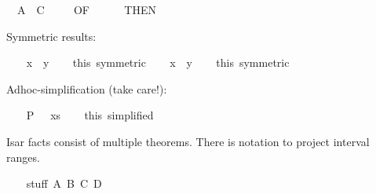 \begin{isabellebody}
\ {}{}\ {}A\ {}\ C{}\isanewline
\ \ \isamarkupfalse%
\ {}\ {}OF\ {}{}\isanewline
\ \ \isamarkupfalse%
\ {}\ {}THEN\ {}{}%
\begin{isamarkuptxt}%
Symmetric results:%
\end{isamarkuptxt}%
\isamarkuptrue%
\ \ \isamarkupfalse%
\ {}x\ {}\ y{}\isanewline
\ \ \isamarkupfalse%
\ this\ {}symmetric{}\isanewline
\isanewline
\ \ \isamarkupfalse%
\ {}x\ {}\ y{}\isanewline
\ \ \isamarkupfalse%
\ this\ {}symmetric{}%
\begin{isamarkuptxt}%
Adhoc-simplification (take care!):%
\end{isamarkuptxt}%
\isamarkuptrue%
\ \ \isamarkupfalse%
\ {}P\ {}{}{}\ {}\ xs{}{}\isanewline
\ \ \isamarkupfalse%
\ this\ {}simplified{}%
\endisatagproof
{\isafoldproof}%
%
\isadelimproof
%
\endisadelimproof
\isanewline
{}\isamarkupfalse%
%
\isamarkuptrue%
%
\begin{isamarkuptext}%
Isar facts consist of multiple theorems.  There is notation to project
  interval ranges.%
\end{isamarkuptext}%
\isamarkuptrue%
\isamarkupfalse%
\isanewline
{}\isanewline
%
\isadelimproof
\ \ %
\endisadelimproof
%
\isatagproof
{}\isamarkupfalse%
\ stuff{}\ A\ B\ C\ D\isanewline

\end{isabellebody}
